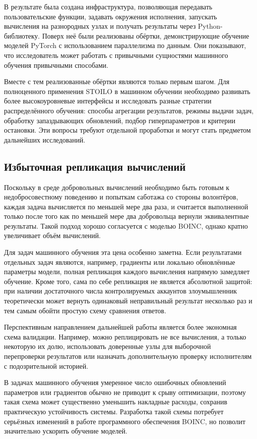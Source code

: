 \documentclass[a4paper,12pt]{extarticle}
\begin{document}
В результате была создана инфраструктура, позволяющая передавать пользовательские функции, задавать окружения исполнения, запускать вычисления на разнородных узлах и получать результаты через Python-библиотеку.
Поверх неё были реализованы обёртки, демонстрирующие обучение моделей PyTorch с использованием параллелизма по данным.
Они показывают, что исследователь может работать с привычными сущностями машинного обучения привычными способами.

Вместе с тем реализованные обёртки являются только первым шагом.
Для полноценного применения STOILO в машинном обучении необходимо развивать более высокоуровневые интерфейсы и исследовать разные стратегии распределённого обучения: способы агрегации результатов, режимы выдачи задач, обработку запаздывающих обновлений, подбор гиперпараметров и критерии остановки.
Эти вопросы требуют отдельной проработки и могут стать предметом дальнейших исследований.

\subsection{Избыточная репликация вычислений}

Поскольку в среде добровольных вычислений необходимо быть готовым к недобросовестному поведению и попыткам саботажа со стороны волонтёров, каждая задача вычисляется по меньшей мере два раза, и считается выполненной только после того как по меньшей мере два добровольца вернули эквивалентные результаты.
Такой подход хорошо согласуется с моделью BOINC, однако кратно увеличивает объём вычислений.

Для задач машинного обучения эта цена особенно заметна. Если результатами отдельных задач являются, например, градиенты или локально обновлённые параметры модели, полная репликация каждого вычисления напрямую замедляет обучение.
Кроме того, сама по себе репликация не является абсолютной защитой: при наличии достаточного числа контролируемых аккаунтов злоумышленник теоретически может вернуть одинаковый неправильный результат несколько раз и тем самым обойти простую схему сравнения ответов.

Перспективным направлением дальнейшей работы является более экономная схема валидации.
Например, можно реплицировать не все вычисления, а только некоторую
их долю, использовать доверенные узлы для выборочной перепроверки результатов или назначать дополнительную проверку исполнителям с подозрительной историей.

В задачах машинного обучения умеренное число ошибочных обновлений параметров или градиентов обычно не приводит к срыву оптимизации, поэтому такая схема может существенно уменьшить накладные расходы, сохранив практическую устойчивость системы.
Разработка такой схемы потребует серьёзных изменений в работе программного обеспечения BOINC, но позволит значительно ускорить обучение моделей.
\end{document}
